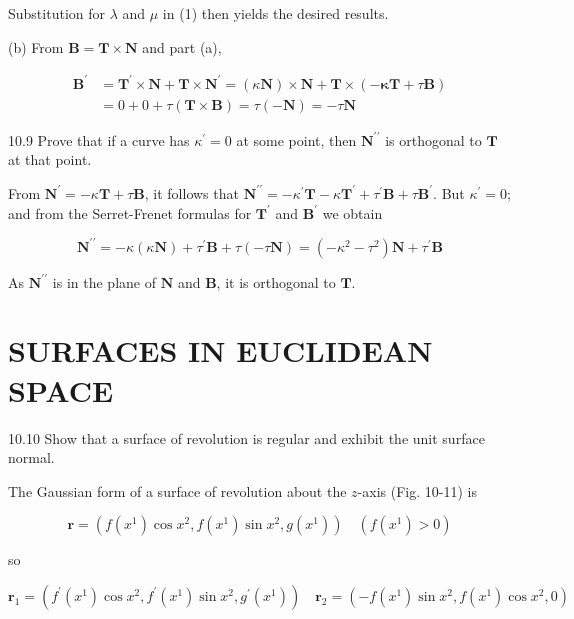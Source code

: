 \documentclass[10pt]{article}
\begin{document}
Substitution for $\lambda$ and $\mu$ in (1) then yields the desired results.

(b) From $\mathbf{B}=\mathbf{T} \times \mathbf{N}$ and part (a),

$$
\begin{aligned}
\mathbf{B}^{\prime} & =\mathbf{T}^{\prime} \times \mathbf{N}+\mathbf{T} \times \mathbf{N}^{\prime}=(\kappa \mathbf{N}) \times \mathbf{N}+\mathbf{T} \times(-\boldsymbol{\kappa} \mathbf{T}+\tau \mathbf{B}) \\
& =0+0+\tau(\mathbf{T} \times \mathbf{B})=\tau(-\mathbf{N})=-\tau \mathbf{N}
\end{aligned}
$$

10.9 Prove that if a curve has $\kappa^{\prime}=0$ at some point, then $\mathbf{N}^{\prime \prime}$ is orthogonal to $\mathbf{T}$ at that point.

From $\mathbf{N}^{\prime}=-\kappa \mathbf{T}+\tau \mathbf{B}$, it follows that $\mathbf{N}^{\prime \prime}=-\kappa^{\prime} \mathbf{T}-\kappa \mathbf{T}^{\prime}+\tau^{\prime} \mathbf{B}+\tau \mathbf{B}^{\prime}$. But $\kappa^{\prime}=0$; and from the Serret-Frenet formulas for $\mathbf{T}^{\prime}$ and $\mathbf{B}^{\prime}$ we obtain

$$
\mathbf{N}^{\prime \prime}=-\kappa(\kappa \mathbf{N})+\tau^{\prime} \mathbf{B}+\tau(-\tau \mathbf{N})=\left(-\kappa^{2}-\tau^{2}\right) \mathbf{N}+\tau^{\prime} \mathbf{B}
$$

As $\mathbf{N}^{\prime \prime}$ is in the plane of $\mathbf{N}$ and $\mathbf{B}$, it is orthogonal to $\mathbf{T}$.

\section*{SURFACES IN EUCLIDEAN SPACE}
10.10 Show that a surface of revolution is regular and exhibit the unit surface normal.

The Gaussian form of a surface of revolution about the $z$-axis (Fig. 10-11) is

$$
\mathbf{r}=\left(f\left(x^{1}\right) \cos x^{2}, f\left(x^{1}\right) \sin x^{2}, g\left(x^{1}\right)\right) \quad\left(f\left(x^{1}\right)>0\right)
$$

so

$$
\mathbf{r}_{1}=\left(f^{\prime}\left(x^{1}\right) \cos x^{2}, f^{\prime}\left(x^{1}\right) \sin x^{2}, g^{\prime}\left(x^{1}\right)\right) \quad \mathbf{r}_{2}=\left(-f\left(x^{1}\right) \sin x^{2}, f\left(x^{1}\right) \cos x^{2}, 0\right)
$$
\end{document}
